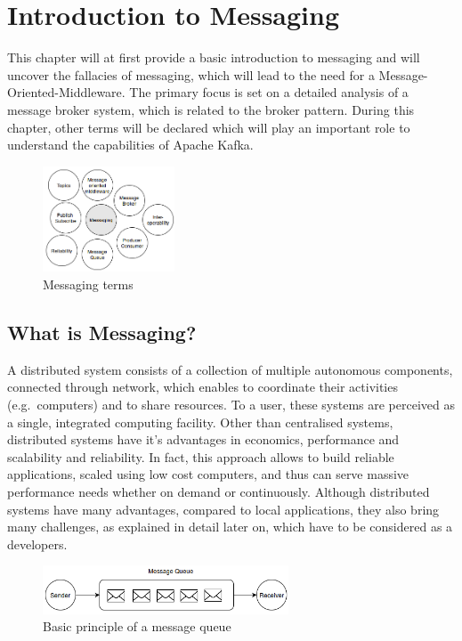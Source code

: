 \chapter{Introduction to Messaging} 

This chapter will at first provide a basic introduction to messaging and will
uncover the fallacies of messaging, which will lead to the need for a
Message-Oriented-Middleware. The primary focus is set on a detailed analysis of a
message broker system, which is related to the broker pattern. During this
chapter, other terms will be declared which will play an important role to
understand the capabilities of Apache Kafka.

\begin{figure}[H]
    \centering
    \includegraphics[width=0.35\textwidth]{images/messaging-intro.png}
    \caption{Messaging terms}
    \label{fig:MBig:the-log}
\end{figure}

\section{What is Messaging?}

A distributed system consists of a collection of multiple autonomous components,
connected through network, which enables to coordinate  their activities (e.g.\
computers) and to share resources. To a user, these systems are perceived as a
single, integrated computing facility. Other than centralised systems,
distributed systems have it's advantages in economics, performance and
scalability and reliability. In fact, this approach allows to build reliable
applications, scaled using low cost computers, and thus can serve massive
performance needs whether on demand or continuously.  Although distributed
systems have many advantages, compared to local applications, they also bring
many challenges, as explained in detail later on, which have to be considered as
a developers.\cite{POSA1}\cite{TAN06}

\begin{figure}[H]
    \centering
    \includegraphics[width=0.65\textwidth]{images/messaging-simple.png}
    \caption{Basic principle of a message queue}
    \label{fig:messaging-simple}
\end{figure}


